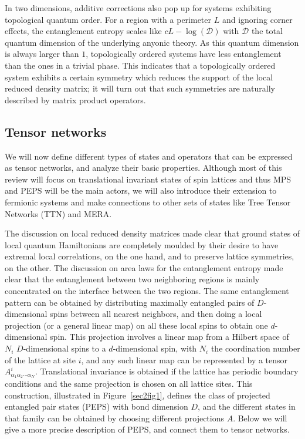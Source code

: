 \documentclass[rmp,aps,reprint,superscriptaddress,nobalancelastpage]{revtex4-1}
\begin{document}
In two dimensions, additive corrections also pop up for systems exhibiting topological quantum order. For a region with a perimeter $L$ and ignoring corner effects, the entanglement entropy scales like $cL-\log(\mathcal{D})$ with $\mathcal{D}$ the total quantum dimension of the underlying anyonic theory. As this quantum dimension is always larger than $1$, topologically ordered systems have less entanglement than the ones in a trivial phase.
This indicates that a topologically ordered system exhibits a certain symmetry which reduces  the support of the local reduced density matrix; it will turn out that such symmetries are naturally described by matrix product operators.

\subsection{Tensor networks}\label{sec2TN}

We will now define different types of states and operators that can be expressed as tensor networks, and analyze their basic properties. Although most of this review will focus on translational invariant states of spin lattices and thus MPS and PEPS will be the main actors, we will also introduce their extension to fermionic systems and make connections to other sets of states like Tree Tensor Networks (TTN) and MERA.

The discussion on local reduced density matrices made clear that ground states of local quantum Hamiltonians are completely moulded by their desire to have extremal local correlations, on the one hand, and to preserve lattice symmetries, on the other. The discussion on area laws for the entanglement entropy made clear that the entanglement between two neighboring regions is mainly concentrated on the interface between the two regions. The same entanglement pattern can be obtained by distributing maximally entangled pairs of $D$-dimensional spins between all nearest neighbors, and then doing a local projection (or a general linear map)  on all these local spins to obtain one $d$-dimensional spin. This projection involves a linear map from a Hilbert space of $N_i$ $D$-dimensional spins to a $d$-dimensional spin, with $N_i$ the coordination number of the lattice at site $i$, and any such linear map can be represented by a tensor $A^i_{\alpha_1\alpha_2\cdots \alpha_N}$. Translational invariance is obtained if the lattice has periodic boundary conditions and the same projection is chosen on all lattice sites. This construction,  illustrated in Figure~\ref{sec2fig1}, defines the class of projected entangled pair states (PEPS) with bond dimension $D$, and the different states in that family can be obtained by choosing different projections $A$. Below we will give a more precise description of PEPS, and connect them to tensor networks.
\end{document}
